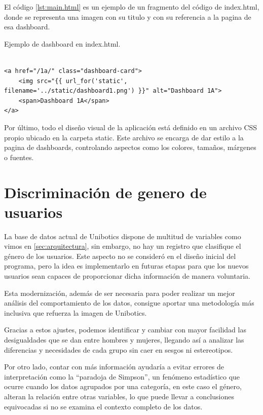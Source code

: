 \documentclass[a4paper, 12pt]{book}
\begin{document}
El código \ref{lst:main.html} es un ejemplo de un fragmento del código de index.html, donde se representa una imagen con su titulo y con su referencia a la pagina de esa dashboard.

\begin{listing}[h!]
\caption{Ejemplo de dashboard en index.html.}
\label{lst:main.html}
\begin{verbatim}

<a href="/1a/" class="dashboard-card">
    <img src="{{ url_for('static', filename='../static/dashboard1.png') }}" alt="Dashboard 1A">
    <span>Dashboard 1A</span>
</a>

\end{verbatim}
\end{listing}

Por último, todo el diseño visual de la aplicación está definido en un archivo CSS propio ubicado en la carpeta static. Este archivo se encarga de dar estilo a la pagina de dashboards, controlando aspectos como los colores, tamaños, márgenes o fuentes.

\section{Discriminación de genero de usuarios}

La base de datos actual de Unibotics dispone de multitud de variables como vimos en \ref{sec:arquitectura}, sin embargo, no hay un registro que clasifique el género de los usuarios. Este aspecto no se consideró en el diseño inicial del programa, pero la idea es implementarlo en futuras etapas para que los nuevos usuarios sean capaces de proporcionar dicha información de manera voluntaria.

Esta modernización, además de ser necesaria para poder realizar un mejor análisis del comportamiento de los datos, consigue aportar una metodología más inclusiva que refuerza la imagen de Unibotics.

Gracias a estos ajustes, podemos identificar y cambiar con mayor facilidad las desigualdades que se dan entre hombres y mujeres, llegando así a analizar las diferencias y necesidades de cada grupo sin caer en sesgos ni estereotipos.

Por otro lado, contar con más información ayudaría a evitar errores de interpretación como la “paradoja de Simpson”\cite{simpsonParadoxWikipedia}, un fenómeno estadístico que ocurre cuando los datos agrupados por una categoría, en este caso el género, alteran la relación entre otras variables, lo que puede llevar a conclusiones equivocadas si no se examina el contexto completo de los datos.
\end{document}
